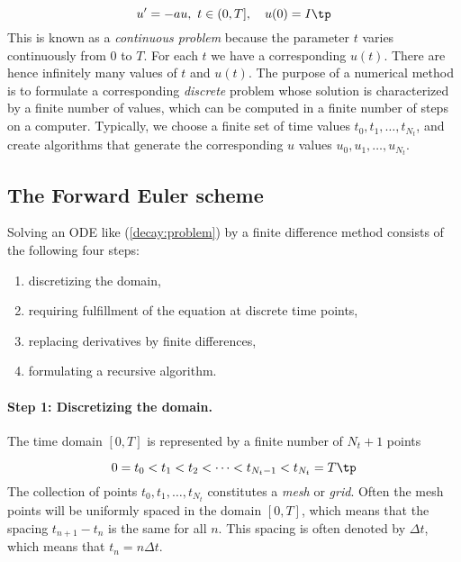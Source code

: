\documentclass[graybox,sectrefs,envcountresetchap,open=right,final]{svmonodo}
\begin{document}
\begin{equation}
u^{\prime} = -au,\ t\in (0,T], \quad u(0)=I\tp   \label{decay:problem}
\end{equation}
This is known as a \emph{continuous problem} because the parameter $t$
varies continuously from $0$ to $T$. For each $t$ we have a corresponding
$u(t)$. There are hence infinitely many values of $t$ and $u(t)$.
The purpose of a numerical method is to formulate a corresponding
\emph{discrete} problem whose solution is characterized by a finite number of values,
which can be computed in a finite number of steps on a computer.
Typically, we choose a finite set of time values $t_0,t_1,\ldots,t_{N_t}$,
and create algorithms that generate the corresponding $u$ values
$u_0,u_1,\ldots,u_{N_t}$.

\subsection{The Forward Euler scheme}
\label{decay:schemes:FE}

Solving an ODE like (\ref{decay:problem}) by a finite difference method
consists of the following four steps:

\begin{enumerate}
\item discretizing the domain,

\item requiring fulfillment of the equation at discrete time points,

\item replacing derivatives by finite differences,

\item formulating a recursive algorithm.
\end{enumerate}

\noindent
{} 

\paragraph{Step 1: Discretizing the domain.}
The time domain $[0,T]$ is represented by a finite number of
$N_t+1$ points

\begin{equation}
0 = t_0 < t_1 < t_2 < \cdots < t_{N_t-1} < t_{N_t} = T\tp
\end{equation}
The collection of points $t_0,t_1,\ldots,t_{N_t}$ constitutes a \emph{mesh}
or \emph{grid}. Often the mesh points will be uniformly spaced in
the domain $[0,T]$, which means that the spacing $t_{n+1}-t_n$ is
the same for all $n$. This spacing is often denoted by $\Delta t$,
which means that $t_n=n\Delta t$.
\end{document}
